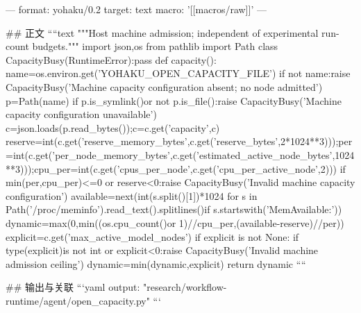 ---
format: yohaku/0.2
target: text
macro: '[[macros/raw]]'
---

## 正文
````text
"""Host machine admission; independent of experimental run-count budgets."""
import json,os
from pathlib import Path
class CapacityBusy(RuntimeError):pass
def capacity():
    name=os.environ.get('YOHAKU_OPEN_CAPACITY_FILE')
    if not name:raise CapacityBusy('Machine capacity configuration absent; no node admitted')
    p=Path(name)
    if p.is_symlink()or not p.is_file():raise CapacityBusy('Machine capacity configuration unavailable')
    c=json.loads(p.read_bytes());c=c.get('capacity',c)
    reserve=int(c.get('reserve_memory_bytes',c.get('reserve_bytes',2*1024**3)));per=int(c.get('per_node_memory_bytes',c.get('estimated_active_node_bytes',1024**3)));cpu_per=int(c.get('cpus_per_node',c.get('cpu_per_active_node',2)))
    if min(per,cpu_per)<=0 or reserve<0:raise CapacityBusy('Invalid machine capacity configuration')
    available=next(int(s.split()[1])*1024 for s in Path('/proc/meminfo').read_text().splitlines()if s.startswith('MemAvailable:'))
    dynamic=max(0,min((os.cpu_count()or 1)//cpu_per,(available-reserve)//per))
    explicit=c.get('max_active_model_nodes')
    if explicit is not None:
        if type(explicit)is not int or explicit<0:raise CapacityBusy('Invalid machine admission ceiling')
        dynamic=min(dynamic,explicit)
    return dynamic
````

## 输出与关联
```yaml
output: "research/workflow-runtime/agent/open_capacity.py"
```

